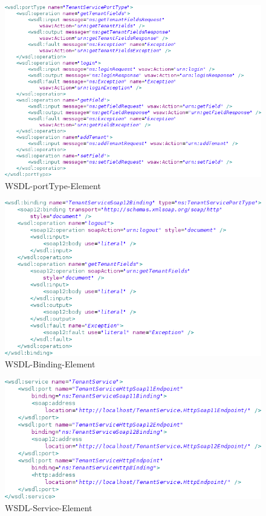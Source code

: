 \documentclass[runningheads]{llncs}
\begin{document}
    \begin{figure}[tbh]
      \centering
      \includegraphics[width=\textwidth]{../images/wsdl_portType.png}
      \caption{WSDL-portType-Element}
      \label{fig:wsdl_portType}
    \end{figure}

    \begin{figure}[tbh]
      \centering
      \includegraphics[width=\textwidth]{../images/wsdl_binding.png}
      \caption{WSDL-Binding-Element}
      \label{fig:wsdl_binding}
    \end{figure}

    \begin{figure}[tbh]
      \centering
      \includegraphics[width=\textwidth]{../images/wsdl_service.png}
      \caption{WSDL-Service-Element}
      \label{fig:wsdl_service}
    \end{figure}
\end{document}
